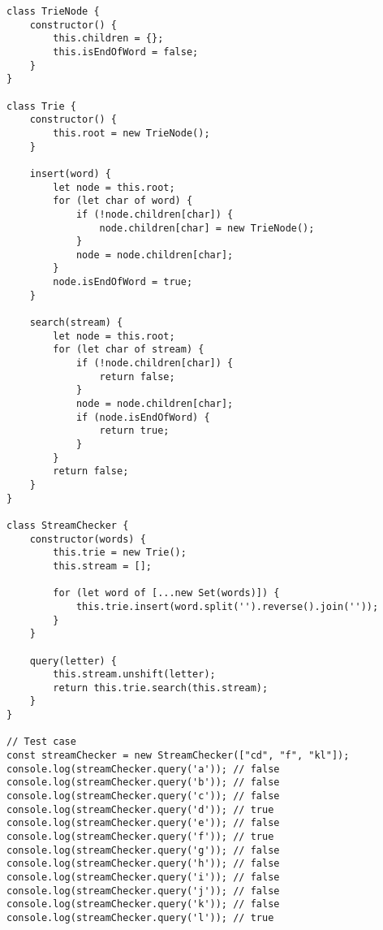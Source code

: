 \begin{tcolorbox}[left=0mm,right=0mm,top=0mm,bottom=0mm,boxsep=1mm,arc=0mm,boxrule=0pt, frame empty, breakable]
    \small
    \begin{lstlisting}
class TrieNode {
    constructor() {
        this.children = {};
        this.isEndOfWord = false;
    }
}

class Trie {
    constructor() {
        this.root = new TrieNode();
    }

    insert(word) {
        let node = this.root;
        for (let char of word) {
            if (!node.children[char]) {
                node.children[char] = new TrieNode();
            }
            node = node.children[char];
        }
        node.isEndOfWord = true;
    }

    search(stream) {
        let node = this.root;
        for (let char of stream) {
            if (!node.children[char]) {
                return false;
            }
            node = node.children[char];
            if (node.isEndOfWord) {
                return true;
            }
        }
        return false;
    }
}

class StreamChecker {
    constructor(words) {
        this.trie = new Trie();
        this.stream = [];

        for (let word of [...new Set(words)]) {
            this.trie.insert(word.split('').reverse().join(''));
        }
    }

    query(letter) {
        this.stream.unshift(letter);
        return this.trie.search(this.stream);
    }
}

// Test case
const streamChecker = new StreamChecker(["cd", "f", "kl"]);
console.log(streamChecker.query('a')); // false
console.log(streamChecker.query('b')); // false
console.log(streamChecker.query('c')); // false
console.log(streamChecker.query('d')); // true
console.log(streamChecker.query('e')); // false
console.log(streamChecker.query('f')); // true
console.log(streamChecker.query('g')); // false
console.log(streamChecker.query('h')); // false
console.log(streamChecker.query('i')); // false
console.log(streamChecker.query('j')); // false
console.log(streamChecker.query('k')); // false
console.log(streamChecker.query('l')); // true
\end{lstlisting}
\end{tcolorbox}